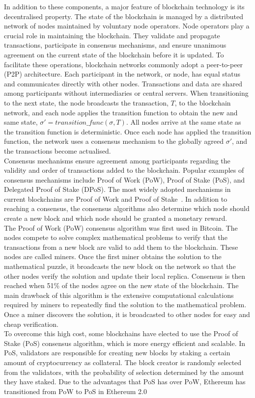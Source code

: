 \noindent In addition to these components, a major feature of blockchain technology is its decentralised property. The state of the blockchain is managed by a distributed network of nodes maintained by voluntary node operators. Node operators play a crucial role in maintaining the blockchain. They validate and propagate transactions, participate in consensus mechanisms, and ensure unanimous agreement on the current state of the blockchain before it is updated. To facilitate these operations, blockchain networks commonly adopt a peer-to-peer (P2P) architecture. Each participant in the network, or node, has equal status and communicates directly with other nodes. Transactions and data are shared among participants without intermediaries or central servers. When transitioning to the next state, the node broadcasts the transaction, $T$, to the blockchain network, and each node applies the transition function to obtain the new and same state, $\sigma' = transition\_func(\sigma, T)$. All nodes arrive at the same state as the transition function is deterministic. Once each node has applied the transition function, the network uses a consensus mechanism to the globally agreed $\sigma'$, and the transactions become actualised.
\\[3mm]
Consensus mechanisms ensure agreement among participants regarding the validity and order of transactions added to the blockchain. Popular examples of consensus mechanisms include Proof of Work (PoW), Proof of Stake (PoS), and Delegated Proof of Stake (DPoS). The most widely adopted mechanisms in current blockchains are Proof of Work and Proof of Stake~\cite{noauthor_consensus_nodate}. In addition to reaching a consensus, the consensus algorithms also determine which node should create a new block and which node should be granted a monetary reward.
\\[3mm]
The Proof of Work (PoW) consensus algorithm was first used in Bitcoin. The nodes compete to solve complex mathematical problems to verify that the transactions from a new block are valid to add them to the blockchain. These nodes are called miners. Once the first miner obtains the solution to the mathematical puzzle, it broadcasts the new block on the network so that the other nodes verify the solution and update their local replica. Consensus is then reached when 51\% of the nodes agree on the new state of the blockchain. The main drawback of this algorithm is the extensive computational calculations required by miners to repeatedly find the solution to the mathematical problem. Once a miner discovers the solution, it is broadcasted to other nodes for easy and cheap verification.
\\[3mm]
To overcome this high cost, some blockchains have elected to use the Proof of Stake (PoS) consensus algorithm, which is more energy efficient and scalable. In PoS, validators are responsible for creating new blocks by staking a certain amount of cryptocurrency as collateral. The block creator is randomly selected from the validators, with the probability of selection determined by the amount they have staked. Due to the advantages that PoS has over PoW, Ethereum has transitioned from PoW to PoS in Ethereum 2.0

